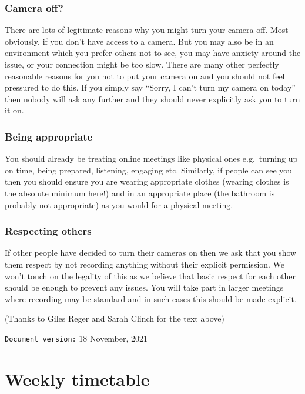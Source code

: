 \documentclass[
]{book}
\begin{document}
\hypertarget{off}{%
\subsection{Camera off?}\label{off}}

There are lots of legitimate reasons why you might turn your camera off. Most obviously, if you don't have access to a camera. But you may also be in an environment which you prefer others not to see, you may have anxiety around the issue, or your connection might be too slow. There are many other perfectly reasonable reasons for you not to put your camera on and you should not feel pressured to do this. If you simply say ``Sorry, I can't turn my camera on today'' then nobody will ask any further and they should never explicitly ask you to turn it on.

\hypertarget{being}{%
\subsection{Being appropriate}\label{being}}

You should already be treating online meetings like physical ones e.g.~turning up on time, being prepared, listening, engaging etc. Similarly, if people can see you then you should ensure you are wearing appropriate clothes (wearing clothes is the absolute minimum here!) and in an appropriate place (the bathroom is probably not appropriate) as you would for a physical meeting.

\hypertarget{respecting}{%
\subsection{Respecting others}\label{respecting}}

If other people have decided to turn their cameras on then we ask that you show them respect by not recording anything without their explicit permission. We won't touch on the legality of this as we believe that basic respect for each other should be enough to prevent any issues. You will take part in larger meetings where recording may be standard and in such cases this should be made explicit.

(Thanks to Giles Reger and Sarah Clinch for the text above)

\texttt{Document\ version:} 18 November, 2021

\hypertarget{timetabling}{%
\chapter*{Weekly timetable}\label{timetabling}}
\end{document}
